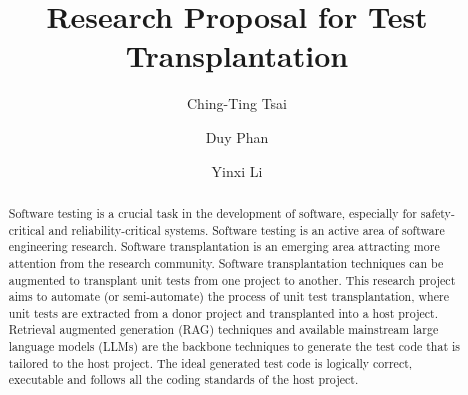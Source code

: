 \documentclass[sigconf]{acmart}
\begin{document}
\title{Research Proposal for Test Transplantation}

\author{Ching-Ting Tsai}

\author{Duy Phan}

\author{Yinxi Li}


\renewcommand{\shortauthors}{Trovato et al.}

\begin{abstract}
%
Software testing is a crucial task in the development of software, especially for safety-critical and reliability-critical systems.
%
Software testing is an active area of software engineering research.
%
Software transplantation is an emerging area attracting more attention from the research community.
%
Software transplantation techniques can be augmented to transplant unit tests from one project to another. 
%
This research project aims to automate (or semi-automate) the process of unit test transplantation, where unit tests are extracted from a donor project and transplanted into a host project.
%
Retrieval augmented generation (RAG) techniques and available mainstream large language models (LLMs) are the backbone techniques to generate the test code that is tailored to the host project.
%
The ideal generated test code is logically correct, executable and follows all the coding standards of the host project.
%
\end{abstract}
\end{document}
